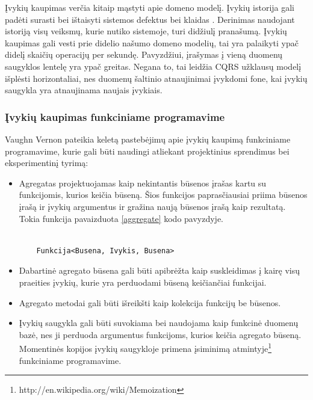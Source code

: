 Įvykių kaupimas verčia kitaip mąstyti apie domeno modelį. Įvykių istorija gali padėti surasti bei ištaisyti sistemos defektus bei klaidas \cite{SeanFitz2012}. Derinimas naudojant istoriją visų veiksmų, kurie nutiko sistemoje, turi didžiulį pranašumą. Įvykių kaupimas gali vesti prie didelio našumo domeno modelių, tai yra palaikyti ypač didelį skaičių operacijų per sekundę. Pavyzdžiui, įrašymas į vieną duomenų saugyklos lentelę yra ypač greitas. Negana to, tai leidžia CQRS užklausų modelį išplėsti horizontaliai, nes duomenų šaltinio atnaujinimai įvykdomi fone, kai įvykių saugykla yra atnaujinama naujais įvykiais.

\subsubsection{Įvykių kaupimas funkciniame programavime}

Vaughn Vernon pateikia keletą pastebėjimų apie įvykių kaupimą funkciniame programavime, kurie gali būti naudingi atliekant projektinius sprendimus bei eksperimentinį tyrimą:

\begin{itemize}

	\item Agregatas projektuojamas kaip nekintantis būsenos įrašas kartu su funkcijomis, kurios keičia būseną. Šios funkcijos paprasčiausiai priima būsenos įrašą ir įvykių argumentus ir gražina naują būsenos įrašą kaip rezultatą. Tokia funkcija pavaizduota \ref{aggregate} kodo pavyzdyje.

\begin{lstlisting}[caption=- agregato būsenos keitimas, label=aggregate]

	Funkcija<Busena, Ivykis, Busena>

\end{lstlisting}

	\item Dabartinė agregato būsena gali būti apibrėžta kaip suskleidimas į kairę visų praeities įvykių, kurie yra perduodami būseną keičiančiai funkcijai.

	\item Agregato metodai gali būti išreikšti kaip kolekcija funkcijų be būsenos.

	\item Įvykių saugykla gali būti suvokiama bei naudojama kaip funkcinė duomenų bazė, nes ji perduoda argumentus funkcijoms, kurios keičia agregato būseną. Momentinės kopijos įvykių saugykloje primena įsiminimą atmintyje\footnote{http://en.wikipedia.org/wiki/Memoization} funkciniame programavime.

\end{itemize}

